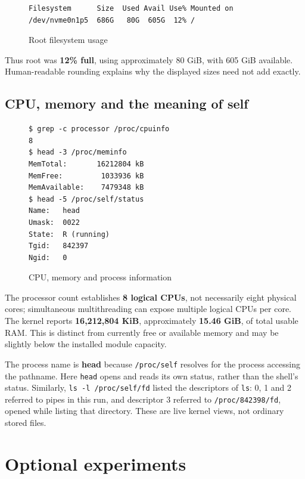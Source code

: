 \documentclass{../latex/utmreport}
\begin{document}
\begin{figure}[H]
\begin{lstlisting}
Filesystem      Size  Used Avail Use% Mounted on
/dev/nvme0n1p5  686G   80G  605G  12% /
\end{lstlisting}
\caption{Root filesystem usage}
\end{figure}

Thus root was \textbf{12\% full}, using approximately 80 GiB, with 605
GiB available. Human-readable rounding explains why the displayed sizes
need not add exactly.

\section{CPU, memory and the meaning of
self}\label{cpu-memory-and-the-meaning-of-self}

\begin{figure}[H]
\begin{lstlisting}
$ grep -c processor /proc/cpuinfo
8
$ head -3 /proc/meminfo
MemTotal:       16212804 kB
MemFree:         1033936 kB
MemAvailable:    7479348 kB
$ head -5 /proc/self/status
Name:   head
Umask:  0022
State:  R (running)
Tgid:   842397
Ngid:   0
\end{lstlisting}
\caption{CPU, memory and process information}
\end{figure}

The processor count establishes \textbf{8 logical CPUs}, not necessarily
eight physical cores; simultaneous multithreading can expose multiple
logical CPUs per core. The kernel reports \textbf{16,212,804 KiB},
approximately \textbf{15.46 GiB}, of total usable RAM. This is distinct
from currently free or available memory and may be slightly below the
installed module capacity.

The process name is \textbf{head} because \texttt{/proc/self} resolves
for the process accessing the pathname. Here \texttt{head} opens and
reads its own status, rather than the shell's status. Similarly,
\texttt{ls\ -l\ /proc/self/fd} listed the descriptors of \texttt{ls}: 0,
1 and 2 referred to pipes in this run, and descriptor 3 referred to
\texttt{/proc/842398/fd}, opened while listing that directory. These are
live kernel views, not ordinary stored files.

\chapter{Optional experiments}\label{optional-experiments}
\end{document}
